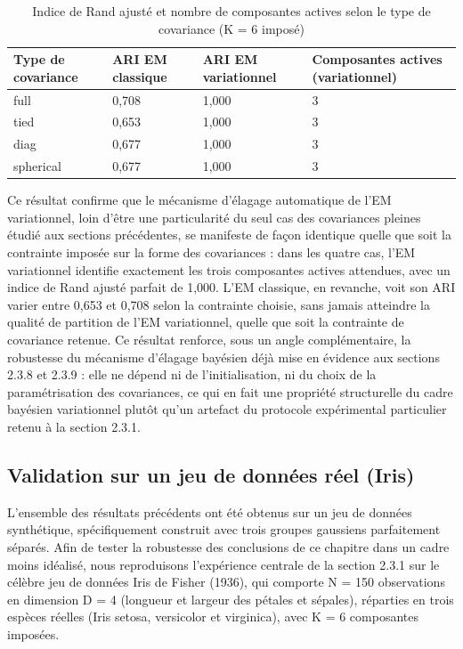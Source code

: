 \begin{table}[H]
\centering
\small
\setlength{\tabcolsep}{0.14cm}
\begin{tabular}{|p{3.54cm}|p{3.54cm}|p{3.54cm}|p{3.54cm}|}
\hline
\textbf{Type de covariance} & \textbf{ARI  EM classique} & \textbf{ARI  EM variationnel} & \textbf{Composantes actives (variationnel)} \\
\hline
full & 0,708 & 1,000 & 3 \\
\hline
tied & 0,653 & 1,000 & 3 \\
\hline
diag & 0,677 & 1,000 & 3 \\
\hline
spherical & 0,677 & 1,000 & 3 \\
\hline
\end{tabular}
\caption{Indice de Rand ajusté et nombre de composantes actives selon le type de covariance (K = 6 imposé)}
\label{tab:2_12}
\end{table}
Ce résultat confirme que le mécanisme d'élagage automatique de l'EM variationnel, loin d'être une particularité du seul cas des covariances pleines étudié aux sections précédentes, se manifeste de façon identique quelle que soit la contrainte imposée sur la forme des covariances : dans les quatre cas, l'EM variationnel identifie exactement les trois composantes actives attendues, avec un indice de Rand ajusté parfait de 1,000. L'EM classique, en revanche, voit son ARI varier entre 0,653 et 0,708 selon la contrainte choisie, sans jamais atteindre la qualité de partition de l'EM variationnel, quelle que soit la contrainte de covariance retenue. Ce résultat renforce, sous un angle complémentaire, la robustesse du mécanisme d'élagage bayésien déjà mise en évidence aux sections 2.3.8 et 2.3.9 : elle ne dépend ni de l'initialisation, ni du choix de la paramétrisation des covariances, ce qui en fait une propriété structurelle du cadre bayésien variationnel plutôt qu'un artefact du protocole expérimental particulier retenu à la section 2.3.1.

\subsection{Validation sur un jeu de données réel (Iris)}
L'ensemble des résultats précédents ont été obtenus sur un jeu de données synthétique, spécifiquement construit avec trois groupes gaussiens parfaitement séparés. Afin de tester la robustesse des conclusions de ce chapitre dans un cadre moins idéalisé, nous reproduisons l'expérience centrale de la section 2.3.1 sur le célèbre jeu de données Iris de Fisher (1936), qui comporte N = 150 observations en dimension D = 4 (longueur et largeur des pétales et sépales), réparties en trois espèces réelles (Iris setosa, versicolor et virginica), avec K = 6 composantes imposées.

